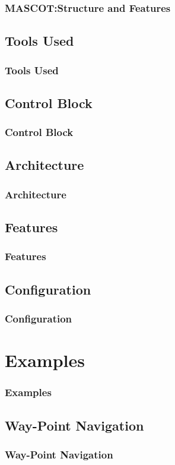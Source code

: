 \documentclass[10pt]{beamer}
\begin{document}
\begin{frame}
\frametitle{MASCOT:Structure and Features}
\end{frame}

\subsection{Tools Used}
\begin{frame}
\frametitle{Tools Used}
\end{frame}
\subsection{Control Block}
\begin{frame}
\frametitle{Control Block}
\end{frame}

\subsection{Architecture}
\begin{frame}
\frametitle{Architecture}
\end{frame}

\subsection{Features}
\begin{frame}
\frametitle{Features}
\end{frame}

\subsection{Configuration}
\begin{frame}
\frametitle{Configuration}
\end{frame}

\section{Examples}
\begin{frame}
\frametitle{Examples}
\end{frame}

\subsection{Way-Point Navigation}
\begin{frame}
\frametitle{Way-Point Navigation}
\end{frame}
\end{document}

